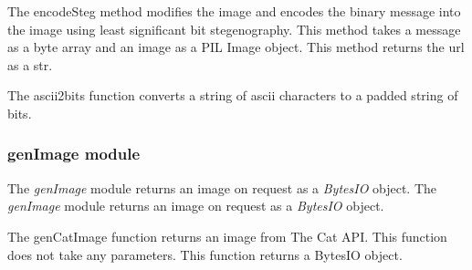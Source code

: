 \documentclass[letterpaper,12pt,openany,oneside]{sphinxmanual}
\begin{document}
\begin{fulllineitems}
\begin{fulllineitems}
\end{fulllineitems}


\begin{fulllineitems}
\label{Image_Manipulation:Image_Manipulation.lsbsteg.Steg.encodeSteg}
The encodeSteg method modifies the image and encodes the binary
message into the image using least significant bit stegenography.
This method takes a message as a byte array and an image as a
PIL Image object.
This method returns the url as a str.

\end{fulllineitems}


\end{fulllineitems}


\begin{fulllineitems}
\label{Image_Manipulation:Image_Manipulation.lsbsteg.ascii2bits}
The ascii2bits function converts a string of ascii characters to a
padded string of bits.

\end{fulllineitems}



\subsubsection{genImage module}
\label{Image_Manipulation:genimage-module}
The \emph{genImage} module returns an image on request as a \emph{BytesIO} object.
\label{Image_Manipulation:module-Image_Manipulation.genImage}
The \emph{genImage} module returns an image on request as a \emph{BytesIO} object.

\begin{fulllineitems}
\label{Image_Manipulation:Image_Manipulation.genImage.genCatImage}
The genCatImage function returns an image from The Cat API.
This function does not take any parameters.
This function returns a BytesIO object.

\end{fulllineitems}
\end{document}
